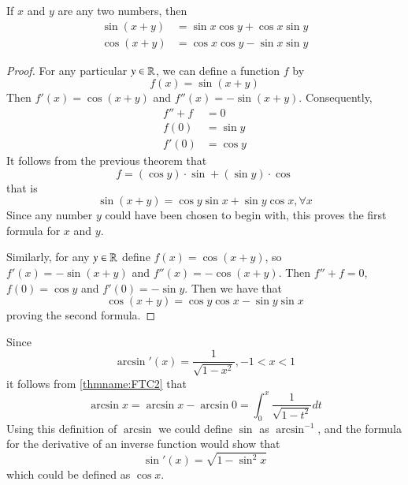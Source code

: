 \documentclass[12pt, a4paper, oneside, openright, titlepage]{book}
\begin{document}
\begin{subappendices}
    \begin{thm}
        If $x$ and $y$ are any two numbers, then \begin{align*}
            \sin(x+y) &= \sin x\cos y + \cos x \sin y \\
            \cos(x+y) &= \cos x\cos y - \sin x \sin y
        \end{align*}
    \end{thm}
    \begin{proof}
        For any particular $y \in \mathbb R$, we can define a function $f$ by \begin{equation*}
            f(x) = \sin(x+y)
        \end{equation*}
        Then $f'(x) = \cos(x+y)$ and $f''(x) = -\sin(x+y)$. Consequently, \begin{align*}
            f'' + f &= 0 \\
            f(0) &= \sin y \\
            f'(0) &= \cos y
        \end{align*}
        It follows from the previous theorem that \begin{equation*}
            f = (\cos y)\cdot \sin + (\sin y) \cdot \cos
        \end{equation*}
        that is \begin{equation*}
            \sin(x+y) = \cos y\sin x+\sin y \cos x,\forall x
        \end{equation*}
        Since any number $y$ could have been chosen to begin with, this proves the first formula for $x$ and $y$.


        Similarly, for any $y \in \mathbb R$ define $f(x) = \cos(x+y)$, so $f'(x) = -\sin(x+y)$ and $f''(x) = -\cos(x+y)$. Then $f'' + f = 0$, $f(0) = \cos y$ and $f'(0) = -\sin y$. Then we have that \begin{equation*}
            \cos(x+y) = \cos y\cos x - \sin y \sin x
        \end{equation*}
        proving the second formula.
    \end{proof}

    \begin{rmk}
        Since \begin{equation*}
            \arcsin'(x) = \frac{1}{\sqrt{1-x^2}}, -1 < x < 1
        \end{equation*}
        it follows from \ref{thmname:FTC2} that \begin{equation*}
            \arcsin x = \arcsin x - \arcsin 0 = \int_0^x\frac{1}{\sqrt{1-t^2}}dt
        \end{equation*}
        Using this definition of $\arcsin$ we could define $\sin$ as $\arcsin^{-1}$, and the formula for the derivative of an inverse function would show that \begin{equation*}
            \sin'(x) = \sqrt{1-\sin^2 x}
        \end{equation*}
        which could be defined as $\cos x$.
    \end{rmk}



\end{subappendices}
\end{document}
